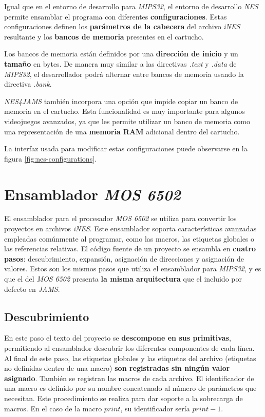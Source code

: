 Igual que en el entorno de desarrollo para \textit{MIPS32},
el entorno de desarrollo \textit{NES} permite ensamblar
el programa con diferentes \textbf{configuraciones}.
Estas configuraciones definen los \textbf{parámetros de la cabecera}
del archivo \textit{iNES} resultante y los \textbf{bancos de memoria}
presentes en el cartucho.

Los bancos de memoria están definidos por una \textbf{dirección de inicio}
y un \textbf{tamaño} en bytes.
De manera muy similar a las directivas \textit{.text}
y \textit{.data} de \textit{MIPS32}, el desarrollador podrá
alternar entre bancos de memoria usando la directiva \textit{.bank}.

\textit{NES4JAMS} también incorpora una opción que impide copiar un
banco de memoria en el cartucho.
Esta funcionalidad es muy importante para algunos videojuegos
avanzados, ya que les permite utilizar un banco de memoria como
una representación de una \textbf{memoria RAM} adicional
dentro del cartucho.

La interfaz usada para modificar estas configuraciones puede observarse
en la figura \ref{fig:nes-configurations}.


\section{Ensamblador \textit{MOS 6502}}\label{sec:ensamblador}

El ensamblador para el procesador \textit{MOS 6502} se utiliza
para convertir los proyectos en archivos \textit{iNES}.
Este ensamblador soporta características avanzadas empleadas
comúnmente al programar, como las macros,
las etiquetas globales o las referencias relativas.
El código fuente de un proyecto se ensambla en \textbf{cuatro pasos}:
descubrimiento, expansión, asignación de direcciones y asignación de valores.
Estos son los mismos pasos que utiliza el ensamblador para \textit{MIPS32},
y es que el del \textit{MOS 6502} presenta \textbf{la misma arquitectura}
que el incluido por defecto en \textit{JAMS}.

\subsection{Descubrimiento}\label{subsec:descubrimiento}

En este paso el texto del proyecto se \textbf{descompone en sus primitivas},
permitiendo al ensamblador descubrir los diferentes componentes de cada línea.
Al final de este paso, las etiquetas globales y las etiquetas del archivo
(etiquetas no definidas dentro de una macro) \textbf{son registradas sin
ningún valor asignado}.
También se registran las macros de cada archivo.
El identificador de una macro es definido por su nombre concatenado
al número de parámetros que necesitan.
Este procedimiento se realiza para dar soporte a la sobrecarga de macros.
En el caso de la macro $print$, su identificador sería
$print-1$.

